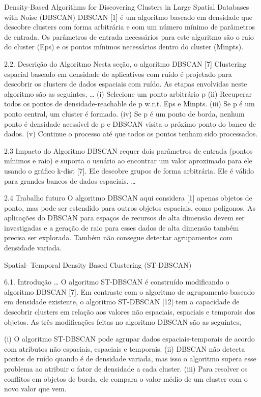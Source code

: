 Density-Based Algorithms for Discovering Clusters in Large Spatial Databases with Noise (DBSCAN)
DBSCAN [1] é um algoritmo baseado em densidade que descobre clusters com forma arbitrária e com um número mínimo de parâmetros de entrada. Os parâmetros de entrada necessários para este algoritmo são o raio do cluster (Eps) e os pontos mínimos necessários dentro do cluster (Minpts).

2.2. Descrição do Algoritmo
Nesta seção, o algoritmo DBSCAN [7] Clustering espacial baseado em densidade de aplicativos com ruído é projetado para descobrir os clusters de dados espaciais com ruído. As etapas envolvidas neste algoritmo são as seguintes,
…
(i) Selecione um ponto arbitrário p
(ii) Recuperar todos os pontos de densidade-reachable de p w.r.t. Eps e Minpts.
(iii) Se p é um ponto central, um cluster é formado.
(iv) Se p é um ponto de borda, nenhum ponto é densidade acessível de p e DBSCAN visita o próximo ponto do banco de dados.
(v) Continue o processo até que todos os pontos tenham sido processados.

2.3 Impacto do Algoritmo
DBSCAN requer dois parâmetros de entrada (pontos mínimos e raio) e suporta o usuário ao encontrar um valor aproximado para ele usando o gráfico k-dist [7]. Ele descobre grupos de forma arbitrária. Ele é válido para grandes bancos de dados espaciais.
…

2.4 Trabalho futuro
O algoritmo DBSCAN aqui considera [1] apenas objetos de ponto, mas pode ser estendido para outros objetos espaciais, como polígonos. As aplicações do DBSCAN para espaços de recursos de alta dimensão devem ser investigadas e a geração de raio para esses dados de alta dimensão também precisa ser explorada. Também não consegue detectar agrupamentos com densidade variada.



Spatial- Temporal Density Based Clustering (ST-DBSCAN)

6.1. Introdução
…
O algoritmo ST-DBSCAN é construído modificando o algoritmo DBSCAN [7]. Em contraste com o algoritmo de agrupamento baseado em densidade existente, o algoritmo ST-DBSCAN [12] tem a capacidade de descobrir clusters em relação aos valores não espaciais, espaciais e temporais dos objetos. As três modificações feitas no algoritmo DBSCAN são as seguintes,

(i) O algoritmo ST-DBSCAN pode agrupar dados espaciais-temporais de acordo com atributos não espaciais, espaciais e temporais.
(ii) DBSCAN não detecta pontos de ruído quando é de densidade variada, mas isso o algoritmo supera esse problema ao atribuir o fator de densidade a cada cluster.
(iii) Para resolver os conflitos em objetos de borda, ele compara o valor médio de um cluster com o novo valor que vem.

